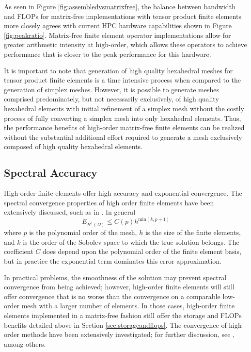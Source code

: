 As seen in Figure \ref{fig:assembledvsmatrixfree}, the balance between bandwidth and FLOPs for matrix-free implementations with tensor product finite elements more closely agrees with current HPC hardware capabilities shown in Figure \ref{fig:peakratio}.
Matrix-free finite element operator implementations allow for greater arithmetic intensity at high-order, which allows these operators to achieve performance that is closer to the peak performance for this hardware.

It is important to note that generation of high quality hexahedral meshes for tensor product finite elements is a time intensive process when compared to the generation of simplex meshes.
However, it is possible to generate meshes comprised predominately, but not necessarily exclusively, of high quality hexahedral elements with initial refinement of a simplex mesh without the costly process of fully converting a simplex mesh into only hexahedral elements.
Thus, the performance benefits of high-order matrix-free finite elements can be realized without the substantial additional effort required to generate a mesh exclusively composed of high quality hexahedral elements.

\subsection{Spectral Accuracy}

High-order finite elements offer high accuracy and exponential convergence.
The spectral convergence properties of high order finite elements have been extensively discussed, such as in \cite{guo1986hp}.
In general
\begin{equation}
E_{H^1 \left( \Omega \right)} \leq C \left( p \right) h^{\text{min} \left( k, p + 1 \right)}
\label{eq:spectral_convergence}
\end{equation}
where $p$ is the polynomial order of the mesh, $h$ is the size of the finite elements, and $k$ is the order of the Sobolev space to which the true solution belongs.
The coefficient $C$ does depend upon the polynomial order of the finite element basis, but in practice the exponential term dominates this error approximation.

In practical problems, the smoothness of the solution may prevent spectral convergence from being achieved; however, high-order finite elements will still offer convergence that is no worse than the convergence on a comparable low-order mesh with a larger number of elements.
In those cases, high-order finite elements implemented in a matrix-free fashion still offer the storage and FLOPs benefits detailed above in Section \ref{sec:storageandflops}.
The convergence of high-order methods have been extensively investigated; for further discussion, see \cite{babuska1982rates}, among others.

